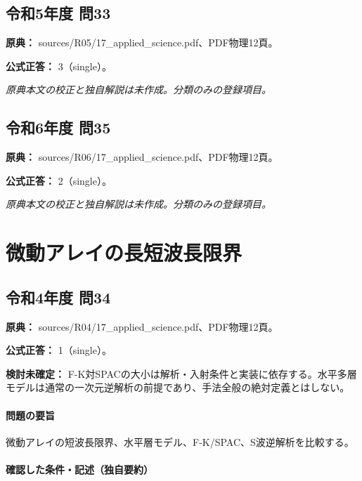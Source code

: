 \subsection{令和5年度 問33}
\label{q:r05-reg-applied-33}

\noindent\textbf{原典：} sources/R05/17\_applied\_science.pdf、PDF物理12頁。

\textbf{公式正答：} 3（single）。

\par\textit{原典本文の校正と独自解説は未作成。分類のみの登録項目。}

\subsection{令和6年度 問35}
\label{q:r06-reg-applied-35}

\noindent\textbf{原典：} sources/R06/17\_applied\_science.pdf、PDF物理12頁。

\textbf{公式正答：} 2（single）。

\par\textit{原典本文の校正と独自解説は未作成。分類のみの登録項目。}

\section{微動アレイの長短波長限界}

\subsection{令和4年度 問34}
\label{q:r04-reg-applied-34}

\noindent\textbf{原典：} sources/R04/17\_applied\_science.pdf、PDF物理12頁。

\textbf{公式正答：} 1（single）。

\par\textbf{検討未確定：} F-K対SPACの大小は解析・入射条件と実装に依存する。水平多層モデルは通常の一次元逆解析の前提であり、手法全般の絶対定義とはしない。

\paragraph{問題の要旨} 微動アレイの短波長限界、水平層モデル、F-K/SPAC、S波逆解析を比較する。

\paragraph{確認した条件・記述（独自要約）}\mbox{}\par

